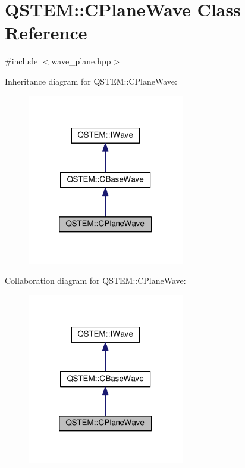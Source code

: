 \hypertarget{class_q_s_t_e_m_1_1_c_plane_wave}{\section{Q\-S\-T\-E\-M\-:\-:C\-Plane\-Wave Class Reference}
\label{class_q_s_t_e_m_1_1_c_plane_wave}
}


{\ttfamily \#include $<$wave\-\_\-plane.\-hpp$>$}



Inheritance diagram for Q\-S\-T\-E\-M\-:\-:C\-Plane\-Wave\-:
\nopagebreak
\begin{figure}[H]
\begin{center}
\leavevmode
\includegraphics[width=194pt]{class_q_s_t_e_m_1_1_c_plane_wave__inherit__graph}
\end{center}
\end{figure}


Collaboration diagram for Q\-S\-T\-E\-M\-:\-:C\-Plane\-Wave\-:
\nopagebreak
\begin{figure}[H]
\begin{center}
\leavevmode
\includegraphics[width=194pt]{class_q_s_t_e_m_1_1_c_plane_wave__coll__graph}
\end{center}
\end{figure}
